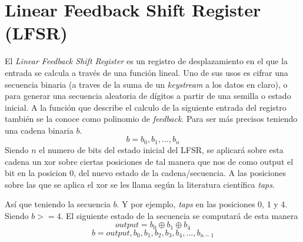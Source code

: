 \section{Linear Feedback Shift Register (LFSR)}
El \textit{Linear Feedback Shift Register} es un registro de desplazamiento en el que la entrada se calcula a través de una función lineal. Uno de sus usos es cifrar una secuencia binaria (a traves de la suma de un \textit{keystream} a los datos en claro), o para generar una secuencia aleatoria de dígitos a partir de una semilla o estado inicial. A la función que describe el calculo de la siguiente entrada del registro también se la conoce como polinomio de \textit{feedback}.  %
Para ser más precisos teniendo una cadena binaria $b$.
\[ b = b_0, b_1, ... , b_n\]
Siendo \(n\) el numero de bits del estado inicial del LFSR, se aplicará sobre esta cadena un xor sobre ciertas posiciones de tal manera que nos de como output el bit en la posicion 0, del nuevo estado de la cadena/secuencia. A las posiciones sobre las que se aplica el xor se les llama según la literatura científica \textit{taps}.

Así que teniendo la secuencia $b$. Y por ejemplo, \textit{taps} en las posiciones 0, 1 y 4. Siendo \(b>=4\). El siguiente estado de la secuencia se computará de esta manera
\[ output = b_0 \oplus b_1 \oplus b_4 \]
\[ b = output, b_0, b_1, b_2, b_3, b_4, ..., b_{n-1}\]


